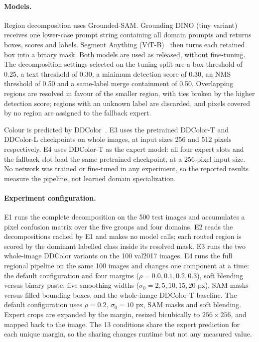 \documentclass{FastFyp}
\begin{document}
\paragraph{Models.}
Region decomposition uses Grounded-SAM. Grounding DINO
(tiny variant)~\cite{liu2024groundingdino} receives one lower-case prompt string
containing all domain prompts and returns boxes, scores and labels. Segment
Anything (ViT-B)~\cite{kirillov2023sam} then turns each retained box into a
binary mask. Both models are used as released, without fine-tuning. The
decomposition settings selected on the tuning split are a box threshold of
0.25, a text threshold of 0.30, a minimum detection score of 0.30, an NMS
threshold of 0.50 and a same-label merge containment of 0.50. Overlapping
regions are resolved in favour of the smaller region, with ties broken by the
higher detection score; regions with an unknown label are discarded, and pixels
covered by no region are assigned to the fallback expert.

Colour is predicted by DDColor~\cite{ref9}. E3 uses the pretrained DDColor-T
and DDColor-L checkpoints on whole images, at input sizes 256 and 512 pixels
respectively. E4 uses DDColor-T as the expert model: all four expert slots and
the fallback slot load the same pretrained checkpoint, at a 256-pixel input
size. No network was trained or fine-tuned in any experiment, so the reported
results measure the pipeline, not learned domain specialization.

\paragraph{Experiment configuration.}
E1 runs the complete decomposition on the 500 test images and accumulates a
pixel confusion matrix over the five groups and four domains. E2 reads the
decompositions cached by E1 and makes no model calls; each routed region is
scored by the dominant labelled class inside its resolved mask. E3 runs the two
whole-image DDColor variants on the 100 val2017 images. E4 runs the full
regional pipeline on the same 100 images and changes one component at a time:
the default configuration and four margins ($\rho=0.0,0.1,0.2,0.3$), soft
blending versus binary paste, five smoothing widths
($\sigma_0=2,5,10,15,20$ px), SAM masks versus filled bounding boxes, and the
whole-image DDColor-T baseline. The default configuration uses
$\rho=0.2$, $\sigma_0=10$ px, SAM masks and soft blending. Expert crops are
expanded by the margin, resized bicubically to $256\times256$, and mapped back
to the image. The 13 conditions share the expert prediction for each unique
margin, so the sharing changes runtime but not any measured value.
\end{document}
